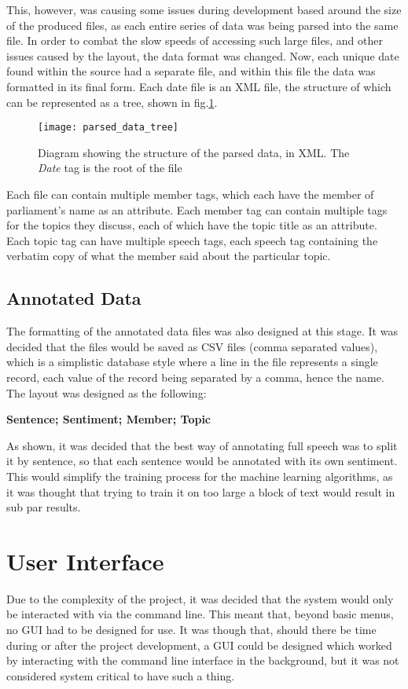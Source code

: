This, however, was causing some issues during development based around the size of the produced files, as each entire series of data was being parsed into the same file. In order to combat the slow speeds of accessing such large files, and other issues caused by the layout, the data format was changed. Now, each unique date found within the source had a separate file, and within this file the data was formatted in its final form.
Each date file is an XML file, the structure of which can be represented as a tree, shown in fig.\ref{fig:parsed_data_tree}.

\begin{figure}[ht]
	\texttt{[image: parsed\_data\_tree]}
	\caption{Diagram showing the structure of the parsed data, in XML. The \emph{Date} tag is the root of the file}
	\label{fig:parsed_data_tree}
\end{figure}

Each file can contain multiple member tags, which each have the member of parliament’s name as an attribute. Each member tag can contain multiple tags for the topics they discuss, each of which have the topic title as an attribute. Each topic tag can have multiple speech tags, each speech tag containing the verbatim copy of what the member said about the particular topic.

\subsection{Annotated Data}
The formatting of the annotated data files was also designed at this stage. It was decided that the files would be saved as CSV files (comma separated values), which is a simplistic database style where a line in the file represents a single record, each value of the record being separated by a comma, hence the name. The layout was designed as the following:

\textbf{Sentence; Sentiment; Member; Topic}

As shown, it was decided that the best way of annotating full speech was to split it by sentence, so that each sentence would be annotated with its own sentiment. This would simplify the training process for the machine learning algorithms, as it was thought that trying to train it on too large a block of text would result in sub par results.

\section{User Interface}
Due to the complexity of the project, it was decided that the system would only be interacted with via the command line. This meant that, beyond basic menus, no GUI had to be designed for use. It was though that, should there be time during or after the project development, a GUI could be designed which worked by interacting with the command line interface in the background, but it was not considered system critical to have such a thing.